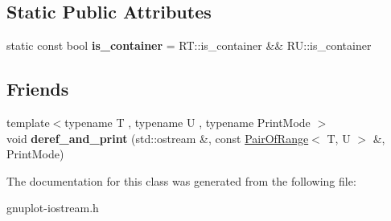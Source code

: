\subsection*{Static Public Attributes}
\begin{DoxyCompactItemize}
\item 
\mbox{\label{classgnuplotio_1_1PairOfRange_ab49c6567f0fa6a82fa2a6245fd964659}} 
static const bool {\bfseries is\+\_\+container} = R\+T\+::is\+\_\+container \&\& R\+U\+::is\+\_\+container
\end{DoxyCompactItemize}
\subsection*{Friends}
\begin{DoxyCompactItemize}
\item 
\mbox{\label{classgnuplotio_1_1PairOfRange_aada62f803432f04aff66f3c609329520}} 
{\footnotesize template$<$typename T , typename U , typename Print\+Mode $>$ }\\void {\bfseries deref\+\_\+and\+\_\+print} (std\+::ostream \&, const \hyperlink{classgnuplotio_1_1PairOfRange}{Pair\+Of\+Range}$<$ T, U $>$ \&, Print\+Mode)
\end{DoxyCompactItemize}


The documentation for this class was generated from the following file\+:\begin{DoxyCompactItemize}
\item 
gnuplot-\/iostream.\+h\end{DoxyCompactItemize}
